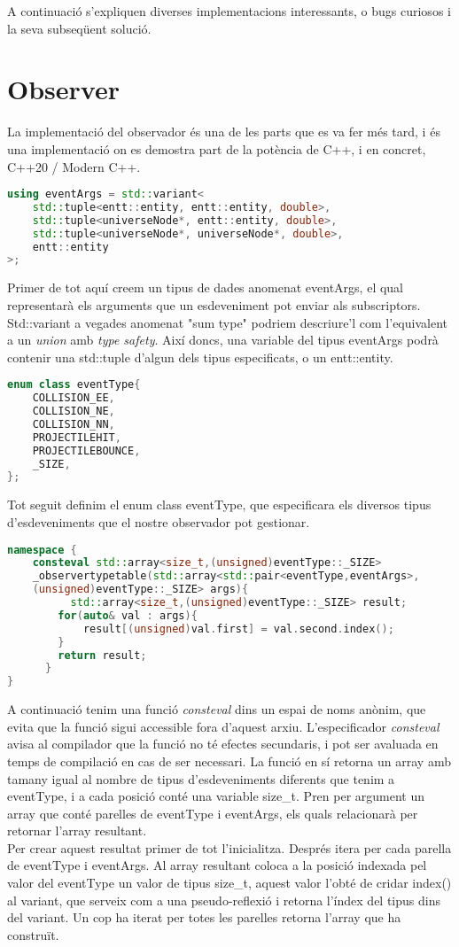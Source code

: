 A continuació s'expliquen diverses implementacions interessants, o bugs curiosos i la seva subseqüent solució.
\section{Observer}
La implementació del observador és una de les parts que es va fer més tard, i és una implementació on es demostra part de la potència de C++, i en concret, C++20 / Modern C++.
\\
\begin{lstlisting}[language=C++]
using eventArgs = std::variant<
	std::tuple<entt::entity, entt::entity, double>,
	std::tuple<universeNode*, entt::entity, double>,
	std::tuple<universeNode*, universeNode*, double>,
	entt::entity
>;
\end{lstlisting}
Primer de tot aquí creem un tipus de dades anomenat eventArgs, el qual representarà els arguments que un esdeveniment pot enviar als subscriptors.
Std::variant a vegades anomenat "sum type" podriem descriure'l com l'equivalent a un \textit{union} amb \textit{type safety}. 
Així doncs, una variable del tipus eventArgs podrà contenir una std::tuple d'algun dels tipus especificats, o un entt::entity.
\\
\begin{lstlisting}[language=C++]
enum class eventType{
	COLLISION_EE,
	COLLISION_NE,
	COLLISION_NN,
	PROJECTILEHIT,
	PROJECTILEBOUNCE,
	_SIZE,
};
\end{lstlisting}
Tot seguit definim el enum class eventType, que especificara els diversos tipus d'esdeveniments que el nostre observador pot gestionar.
\\
\begin{lstlisting}[language=C++]
namespace {
	consteval std::array<size_t,(unsigned)eventType::_SIZE> 
    _observertypetable(std::array<std::pair<eventType,eventArgs>,
    (unsigned)eventType::_SIZE> args){
		  std::array<size_t,(unsigned)eventType::_SIZE> result;
  		for(auto& val : args){
	  		result[(unsigned)val.first] = val.second.index();
  		}
	  	return result;
	  }
}
\end{lstlisting}
A continuació tenim una funció \textit{consteval} dins un espai de noms anònim, que evita que la funció sigui accessible fora d'aquest arxiu.
L'especificador \textit{consteval} avisa al compilador que la funció no té efectes secundaris, i pot ser avaluada en temps de compilació en cas de ser necessari.
La funció en sí retorna un array amb tamany igual al nombre de tipus d'esdeveniments diferents que tenim a eventType, i a cada posició conté una variable size\_t. 
Pren per argument un array que conté parelles de eventType i eventArgs, els quals relacionarà per retornar l'array resultant.
\\
Per crear aquest resultat primer de tot l'inicialitza.
Després itera per cada parella de eventType i eventArgs.
Al array resultant coloca a la posició indexada pel valor del eventType un valor de tipus size\_t, aquest valor l'obté de cridar index() al variant, que serveix com a una pseudo-reflexió i retorna l'índex del tipus dins del variant.
Un cop ha iterat per totes les parelles retorna l'array que ha construït.
\\

